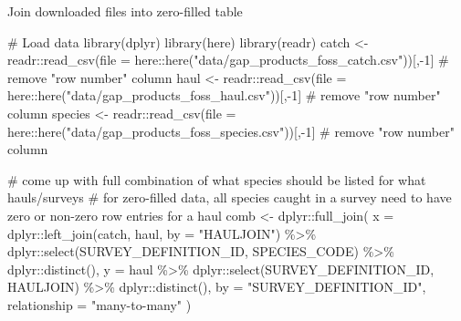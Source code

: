 \documentclass[
  letterpaper,
  oneside,
  open=any]{scrbook}
\newenvironment{Shaded}{\begin{snugshade}}{\end{snugshade}}
\newcommand{\AttributeTok}[1]{\textcolor[rgb]{0.40,0.45,0.13}{#1}}
\newcommand{\CommentTok}[1]{\textcolor[rgb]{0.37,0.37,0.37}{#1}}
\newcommand{\DecValTok}[1]{\textcolor[rgb]{0.68,0.00,0.00}{#1}}
\newcommand{\FunctionTok}[1]{\textcolor[rgb]{0.28,0.35,0.67}{#1}}
\newcommand{\NormalTok}[1]{\textcolor[rgb]{0.00,0.23,0.31}{#1}}
\newcommand{\OtherTok}[1]{\textcolor[rgb]{0.00,0.23,0.31}{#1}}
\newcommand{\SpecialCharTok}[1]{\textcolor[rgb]{0.37,0.37,0.37}{#1}}
\newcommand{\StringTok}[1]{\textcolor[rgb]{0.13,0.47,0.30}{#1}}
\begin{document}
Join downloaded files into zero-filled table

\begin{Shaded}
\begin{Highlighting}[]
\CommentTok{\# Load data}
\FunctionTok{library}\NormalTok{(dplyr)}
\FunctionTok{library}\NormalTok{(here)}
\FunctionTok{library}\NormalTok{(readr)}
\NormalTok{catch }\OtherTok{\textless{}{-}}\NormalTok{ readr}\SpecialCharTok{::}\FunctionTok{read\_csv}\NormalTok{(}\AttributeTok{file =}\NormalTok{ here}\SpecialCharTok{::}\FunctionTok{here}\NormalTok{(}\StringTok{"data/gap\_products\_foss\_catch.csv"}\NormalTok{))[,}\SpecialCharTok{{-}}\DecValTok{1}\NormalTok{] }\CommentTok{\# remove "row number" column}
\NormalTok{haul }\OtherTok{\textless{}{-}}\NormalTok{ readr}\SpecialCharTok{::}\FunctionTok{read\_csv}\NormalTok{(}\AttributeTok{file =}\NormalTok{ here}\SpecialCharTok{::}\FunctionTok{here}\NormalTok{(}\StringTok{"data/gap\_products\_foss\_haul.csv"}\NormalTok{))[,}\SpecialCharTok{{-}}\DecValTok{1}\NormalTok{] }\CommentTok{\# remove "row number" column}
\NormalTok{species }\OtherTok{\textless{}{-}}\NormalTok{ readr}\SpecialCharTok{::}\FunctionTok{read\_csv}\NormalTok{(}\AttributeTok{file =}\NormalTok{ here}\SpecialCharTok{::}\FunctionTok{here}\NormalTok{(}\StringTok{"data/gap\_products\_foss\_species.csv"}\NormalTok{))[,}\SpecialCharTok{{-}}\DecValTok{1}\NormalTok{] }\CommentTok{\# remove "row number" column}

\CommentTok{\# come up with full combination of what species should be listed for what hauls/surveys}
\CommentTok{\# for zero{-}filled data, all species caught in a survey need to have zero or non{-}zero row entries for a haul}
\NormalTok{comb }\OtherTok{\textless{}{-}}\NormalTok{ dplyr}\SpecialCharTok{::}\FunctionTok{full\_join}\NormalTok{(}
  \AttributeTok{x =}\NormalTok{ dplyr}\SpecialCharTok{::}\FunctionTok{left\_join}\NormalTok{(catch, haul, }\AttributeTok{by =} \StringTok{"HAULJOIN"}\NormalTok{) }\SpecialCharTok{\%\textgreater{}\%}
\NormalTok{    dplyr}\SpecialCharTok{::}\FunctionTok{select}\NormalTok{(SURVEY\_DEFINITION\_ID, SPECIES\_CODE) }\SpecialCharTok{\%\textgreater{}\%}
\NormalTok{    dplyr}\SpecialCharTok{::}\FunctionTok{distinct}\NormalTok{(),}
  \AttributeTok{y =}\NormalTok{ haul }\SpecialCharTok{\%\textgreater{}\%}
\NormalTok{    dplyr}\SpecialCharTok{::}\FunctionTok{select}\NormalTok{(SURVEY\_DEFINITION\_ID, HAULJOIN) }\SpecialCharTok{\%\textgreater{}\%}
\NormalTok{    dplyr}\SpecialCharTok{::}\FunctionTok{distinct}\NormalTok{(), }
  \AttributeTok{by =} \StringTok{"SURVEY\_DEFINITION\_ID"}\NormalTok{, }
  \AttributeTok{relationship =} \StringTok{"many{-}to{-}many"}
\NormalTok{)}


\end{Highlighting}
\end{Shaded}
\end{document}
